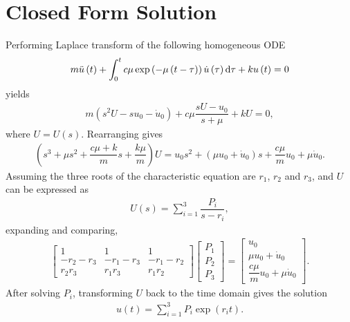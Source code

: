 \appendix
\section{Closed Form Solution}\label{sec:analytical_sdof}
Performing Laplace transform of the following homogeneous ODE
\begin{gather}\label{eq:single_exp}
m\ddot{u}\left(t\right)+\int_0^tc\mu\exp\left(-\mu\left(t-\tau\right)\right)\dot{u}\left(\tau\right)\mathrm{d}\tau+ku\left(t\right)=0
\end{gather}
yields
\begin{gather}
m\left(s^2U-su_0-\dot{u}_0\right)
+c\mu\dfrac{sU-u_0}{s+\mu}
+kU
=0,
\end{gather}
where $U=U\left(s\right)$. Rearranging gives
\begin{gather}
\left(
s^3
+\mu{}s^2
+\dfrac{c\mu+k}{m}s
+\dfrac{k\mu}{m}\right)U
=
u_0s^2
+\left(\mu{}u_0+\dot{u}_0\right)s
+\dfrac{c\mu{}}{m}u_0
+\mu\dot{u}_0.
\end{gather}
Assuming the three roots of the characteristic equation are $r_1$, $r_2$ and $r_3$, and $U$ can be expressed as
\begin{gather}
U\left(s\right)=\sum_{i=1}^3\dfrac{P_i}{s-r_i},
\end{gather}
expanding and comparing,
\begin{gather}
\begin{bmatrix}
1&1&1\\
-r_2-r_3&-r_1-r_3&-r_1-r_2\\
r_2r_3&r_1r_3&r_1r_2
\end{bmatrix}
\begin{bmatrix}
P_1\\P_2\\P_3
\end{bmatrix}
=
\begin{bmatrix}
u_0\\
\mu{}u_0+\dot{u}_0\\
\dfrac{c\mu{}}{m}u_0
+\mu\dot{u}_0
\end{bmatrix}.
\end{gather}
After solving $P_i$, transforming $U$ back to the time domain gives the solution
\begin{gather}
u(t)=\sum_{i=1}^3P_i\exp\left(r_it\right).
\end{gather}

